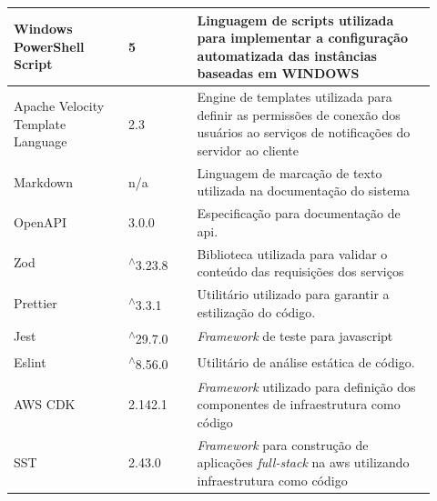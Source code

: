 \begin{longtable}{p{0.25\linewidth} p{0.15\linewidth} p{0.525\linewidth}}
Windows PowerShell Script \citep{windowspowershelldocs} & 5 & Linguagem de scripts utilizada para implementar a configuração automatizada das instâncias baseadas em WINDOWS \\

\hline

Apache Velocity Template Language \citep{apachevelocitydocs} & 2.3 & Engine de templates utilizada para definir as permissões de conexão dos usuários ao serviços de notificações do servidor ao cliente \\

\hline

Markdown \citep{markdowndocs} & \gls{n/a} & Linguagem de marcação de texto utilizada na documentação do sistema \\

\hline

OpenAPI \citep{openapidocs} & 3.0.0 & Especificação para documentação de \gls{api}. \\

\hline

Zod \citep{zoddocs} & \textsuperscript{$\wedge$}3.23.8 & Biblioteca utilizada para validar o conteúdo das requisições dos serviços \\

\hline

Prettier \citep{prettierdocs} & \textsuperscript{$\wedge$}3.3.1 & Utilitário utilizado para garantir a estilização do código. \\

\hline

Jest \citep{jestdocs} & \textsuperscript{$\wedge$}29.7.0 & \textit{Framework} de teste para javascript \\

\hline

Eslint \citep{eslintdocs} & \textsuperscript{$\wedge$}8.56.0 & Utilitário de análise estática de código. \\

\hline

AWS CDK \citep{awscdkdocs} & 2.142.1 & \textit{Framework} utilizado para definição dos componentes de infraestrutura como código \\

\hline

SST \citep{sstdocs} & 2.43.0 & \textit{Framework} para construção de aplicações \textit{full-stack} na \gls{aws} utilizando infraestrutura como código \\

\hline


\end{longtable}
